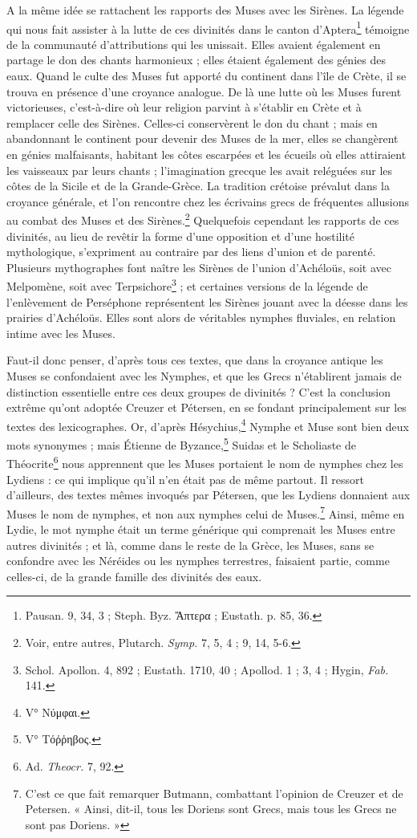 \documentclass[a4paper, 11pt, oneside, polutonikogreek, french]{article}
\begin{document}
A la même idée se rattachent les rapports des Muses avec les Sirènes. La légende qui nous fait assister à la lutte de ces divinités dans le canton d'Aptera\footnote{Pausan. 9, 34, 3 ; Steph. Byz. Ἄπτερα ; Eustath. p. 85, 36.} témoigne de la communauté d'attributions qui les unissait. Elles avaient également en partage le don des chants harmonieux ; elles étaient également des génies des eaux. Quand le culte des Muses fut apporté du continent dans l'île de Crète, il se trouva en présence d'une croyance analogue. De là une lutte où les Muses furent victorieuses, c'est-à-dire où leur religion parvint à s'établir en Crète et à remplacer celle des Sirènes. Celles-ci conservèrent le don du chant ; mais en abandonnant le continent pour devenir des Muses de la mer, elles se changèrent en génies malfaisants, habitant les côtes escarpées et les écueils où elles attiraient les vaisseaux par leurs chants ; l'imagination grecque les avait reléguées sur les côtes de la Sicile et de la Grande-Grèce. La tradition crétoise prévalut dans la croyance générale, et l'on rencontre chez les écrivains grecs de fréquentes allusions au combat des Muses et des Sirènes.\footnote{Voir, entre autres, Plutarch. \emph{Symp.} 7, 5, 4 ; 9, 14, 5-6.} Quelquefois cependant les rapports de ces divinités, au lieu de revêtir la forme d'une opposition et d'une hostilité mythologique, s'expriment au contraire par des liens d'union et de parenté. Plusieurs mythographes font naître les Sirènes de l'union d'Achéloüs, soit avec Melpomène, soit avec Terpsichore\footnote{Schol. Apollon. 4, 892 ; Eustath. 1710, 40 ; Apollod. 1 ; 3, 4 ; Hygin, \emph{Fab.} 141.} ; et certaines versions de la légende de l'enlèvement de Perséphone représentent les Sirènes jouant avec la déesse dans les prairies d'Achéloüs. Elles sont alors de véritables nymphes fluviales, en relation intime avec les Muses.

Faut-il donc penser, d'après tous ces textes, que dans la croyance antique les Muses se confondaient avec les Nymphes, et que les Grecs n'établirent jamais de distinction essentielle entre ces deux groupes de divinités ? C'est la conclusion extrême qu'ont adoptée Creuzer et Pétersen, en se fondant principalement sur les textes des lexicographes. Or, d'après Hésychius,\footnote{V° Νύμφαι.} Nymphe et Muse sont bien deux mots synonymes ; mais Étienne de Byzance,\footnote{V° Τόῤῥηβος.} Suidas et le Scholiaste de Théocrite\footnote{Ad. \emph{Theocr.} 7, 92.} nous apprennent que les Muses portaient le nom de nymphes chez les Lydiens : ce qui implique qu'il n'en était pas de même partout. Il ressort d'ailleurs, des textes mêmes invoqués par Pétersen, que les Lydiens donnaient aux Muses le nom de nymphes, et non aux nymphes celui de Muses.\footnote{C'est ce que fait remarquer Butmann, combattant l'opinion de Creuzer et de Petersen. « Ainsi, dit-il, tous les Doriens sont Grecs, mais tous les Grecs ne sont pas Doriens. »} Ainsi, même en Lydie, le mot nymphe était un terme générique qui comprenait les Muses entre autres divinités ; et là, comme dans le reste de la Grèce, les Muses, sans se confondre avec les Néréides ou les nymphes terrestres, faisaient partie, comme celles-ci, de la grande famille des divinités des eaux.
\end{document}
